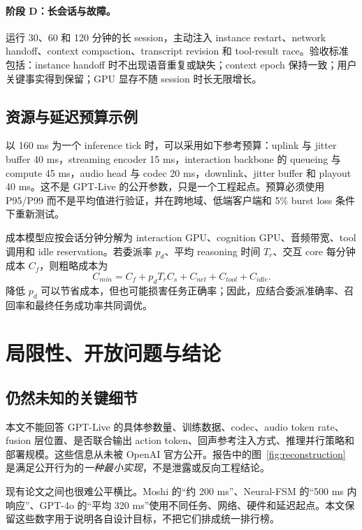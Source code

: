 \documentclass[UTF8,fontset=none,a4paper,10pt]{ctexart}
\begin{document}
\paragraph{阶段 D：长会话与故障。}
运行 30、60 和 120 分钟的长 session，主动注入 instance restart、network handoff、context compaction、transcript revision 和 tool-result race。验收标准包括：instance handoff 时不出现语音重复或缺失；context epoch 保持一致；用户关键事实得到保留；GPU 显存不随 session 时长无限增长。

\subsection{资源与延迟预算示例}

以 160 ms 为一个 inference tick 时，可以采用如下参考预算：uplink 与 jitter buffer 40 ms，streaming encoder 15 ms，interaction backbone 的 queueing 与 compute 45 ms，audio head 与 codec 20 ms，downlink、jitter buffer 和 playout 40 ms。这不是 GPT-Live 的公开参数，只是一个工程起点。预算必须使用 P95/P99 而不是平均值进行验证，并在跨地域、低端客户端和 5\% burst loss 条件下重新测试。

成本模型应按会话分钟分解为 interaction GPU、cognition GPU、音频带宽、tool 调用和 idle reservation。若委派率 $p_d$、平均 reasoning 时间 $T_r$、交互 core 每分钟成本 $C_f$，则粗略成本为
\begin{equation}
C_{min}=C_f+p_dT_rC_s+C_{net}+C_{tool}+C_{idle}.
\end{equation}
降低 $p_d$ 可以节省成本，但也可能损害任务正确率；因此，应结合委派准确率、召回率和最终任务成功率共同调优。

\section{局限性、开放问题与结论}

\subsection{仍然未知的关键细节}

本文不能回答 GPT-Live 的具体参数量、训练数据、codec、audio token rate、fusion 层位置、是否联合输出 action token、回声参考注入方式、推理并行策略和部署规模。这些信息从未被 OpenAI 官方公开。报告中的图~\ref{fig:reconstruction} 是满足公开行为的\emph{一种最小实现}，不是泄露或反向工程结论。

现有论文之间也很难公平横比。Moshi 的“约 200 ms”、Neural-FSM 的“500 ms 内响应”、GPT-4o 的“平均 320 ms”使用不同任务、网络、硬件和延迟起点。本文保留这些数字用于说明各自设计目标，不把它们排成统一排行榜。
\end{document}
